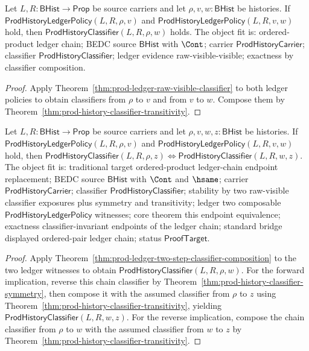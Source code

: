 \begin{theorem}
\label{thm:prod-ledger-two-step-classifier-composition}
Let $L,R:\mathsf{BHist}\to\mathsf{Prop}$ be source carriers and let
$\rho,v,w:\mathsf{BHist}$ be histories. If
$\mathsf{ProdHistoryLedgerPolicy}(L,R,\rho,v)$ and
$\mathsf{ProdHistoryLedgerPolicy}(L,R,v,w)$ hold, then
$\mathsf{ProdHistoryClassifier}(L,R,\rho,w)$ holds. The object fit is:
ordered-product ledger chain; BEDC source $\mathsf{BHist}$ with $\Cont$;
carrier $\mathsf{ProdHistoryCarrier}$; classifier
$\mathsf{ProdHistoryClassifier}$; ledger evidence raw-visible-visible;
exactness by classifier composition.
\end{theorem}
\begin{proof}
Apply Theorem~\ref{thm:prod-ledger-raw-visible-classifier} to both ledger
policies to obtain classifiers from $\rho$ to $v$ and from $v$ to $w$. Compose
them by Theorem~\ref{thm:prod-history-classifier-transitivity}.
\end{proof}

\begin{theorem}
\label{thm:prod-ledger-two-step-classifier-endpoint-equivalence}
Let $L,R:\mathsf{BHist}\to\mathsf{Prop}$ be source carriers and let
$\rho,v,w,z:\mathsf{BHist}$ be histories. If
$\mathsf{ProdHistoryLedgerPolicy}(L,R,\rho,v)$ and
$\mathsf{ProdHistoryLedgerPolicy}(L,R,v,w)$ hold, then
$\mathsf{ProdHistoryClassifier}(L,R,\rho,z) \Longleftrightarrow
\mathsf{ProdHistoryClassifier}(L,R,w,z)$. The object fit is: traditional
target ordered-product ledger-chain endpoint replacement; BEDC source
$\mathsf{BHist}$ with $\Cont$ and $\hsame$; carrier
$\mathsf{ProdHistoryCarrier}$; classifier $\mathsf{ProdHistoryClassifier}$;
stability by two raw-visible classifier exposures plus symmetry and
transitivity; ledger two composable
$\mathsf{ProdHistoryLedgerPolicy}$ witnesses; core theorem this endpoint
equivalence; exactness classifier-invariant endpoints of the ledger chain;
standard bridge displayed ordered-pair ledger chain; status
$\mathsf{ProofTarget}$.
\end{theorem}
\begin{proof}
Apply Theorem~\ref{thm:prod-ledger-two-step-classifier-composition} to the two
ledger witnesses to obtain
$\mathsf{ProdHistoryClassifier}(L,R,\rho,w)$. For the forward implication,
reverse this chain classifier by
Theorem~\ref{thm:prod-history-classifier-symmetry}, then compose it with the
assumed classifier from $\rho$ to $z$ using
Theorem~\ref{thm:prod-history-classifier-transitivity}, yielding
$\mathsf{ProdHistoryClassifier}(L,R,w,z)$. For the reverse implication,
compose the chain classifier from $\rho$ to $w$ with the assumed classifier
from $w$ to $z$ by
Theorem~\ref{thm:prod-history-classifier-transitivity}.
\end{proof}

